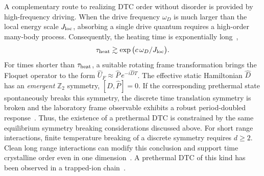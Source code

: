 \documentclass[%
reprint,
superscriptaddress,
amsmath,amssymb,
aps,
prb,
showkeys,%
floatfix,
]{revtex4-2}
\let\cite\citep   %
\begin{document}
	A complementary route to realizing DTC order without disorder is provided by high-frequency driving. When the drive frequency $\omega_D$ is much larger than the local energy scale $J_{\rm loc}$, absorbing a single drive quantum requires a high-order many-body process. Consequently, the heating time is exponentially long~\cite{AbaninCMP2017,Mori2016,KuwaharaMoriSaito2016},
	\begin{equation}
		\tau_{\rm heat}\gtrsim\exp\big(c\,\omega_D/J_{\rm loc}\big).
	\end{equation}
	For times shorter than $\tau_{\rm heat}$, a suitable rotating frame transformation brings the Floquet operator to the form $\hat{U}_F\approx\hat{P}\,e^{-i\hat{D}T}$. The effective static Hamiltonian $\hat{D}$ has an \emph{emergent} $\mathbb{Z}_2$ symmetry, $[\hat{D},\hat{P}]=0$. If the corresponding prethermal state spontaneously breaks this symmetry, the discrete time translation symmetry is broken and the laboratory frame observable exhibits a robust period-doubled response~\cite{ElseBauerNayakPRX2017}. Thus, the existence of a prethermal DTC is constrained by the same equilibrium symmetry breaking considerations discussed above. For short range interactions, finite temperature breaking of a discrete symmetry requires $d\ge 2$. Clean long range interactions can modify this conclusion and support time crystalline order even in one dimension~\cite{Russomanno2017,Pizzi2021}. A prethermal DTC of this kind has been observed in a trapped-ion chain~\cite{Kyprianidis2021}.
	
\end{document}
